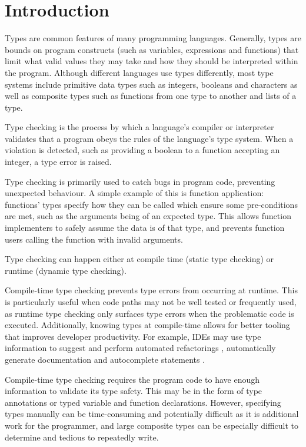 \documentclass[a4paper,fleqn,oneside,12pt]{report}
\begin{document}
\tableofcontents

\chapter{Introduction}\label{id:h.6k9gcmunzldy}

Types are common features of many programming languages. Generally, types are bounds on program constructs (such as variables, expressions and functions) that limit what valid values they may take and how they should be interpreted within the program. Although different languages use types differently, most type systems include primitive data types such as integers, booleans and characters as well as composite types such as functions from one type to another and lists of a type.

Type checking is the process by which a language's compiler or interpreter validates that a program obeys the rules of the language's type system. When a violation is detected, such as providing a boolean to a function accepting an integer, a type error is raised.

Type checking is primarily used to catch bugs in program code, preventing unexpected behaviour. A simple example of this is function application: functions’ types specify how they can be called which ensure some pre-conditions are met, such as the arguments being of an expected type. This allows function implementers to safely assume the data is of that type, and prevents function users calling the function with invalid arguments.

Type checking can happen either at compile time (static type checking) or runtime (dynamic type checking).

Compile-time type checking prevents type errors from occurring at runtime. This is particularly useful when code paths may not be well tested or frequently used, as runtime type checking only surfaces type errors when the problematic code is executed. Additionally, knowing types at compile-time allows for better tooling that improves developer productivity. For example, IDEs may use type information to suggest and perform automated refactorings \citep{ref1}, automatically generate documentation \citep{ref2} and autocomplete statements \citep{ref3}.

Compile-time type checking requires the program code to have enough information to validate its type safety. This may be in the form of type annotations or typed variable and function declarations. However, specifying types manually can be time-consuming and potentially difficult as it is additional work for the programmer, and large composite types can be especially difficult to determine and tedious to repeatedly write.
\end{document}
